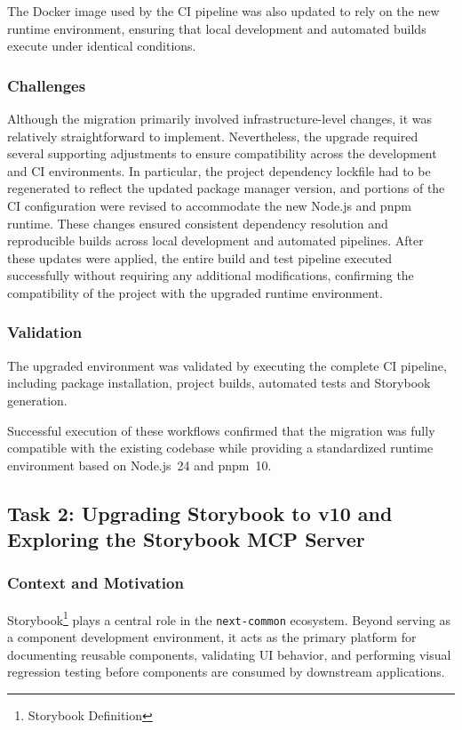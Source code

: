 The Docker image used by the CI pipeline was also updated to rely on the new runtime environment, ensuring that local development and automated builds execute under identical conditions.

\subsubsection{Challenges}

Although the migration primarily involved infrastructure-level changes, it was relatively straightforward to implement. Nevertheless, the upgrade required several supporting adjustments to ensure compatibility across the development and CI environments. In particular, the project dependency lockfile had to be regenerated to reflect the updated package manager version, and portions of the CI configuration were revised to accommodate the new Node.js and pnpm runtime. These changes ensured consistent dependency resolution and reproducible builds across local development and automated pipelines. After these updates were applied, the entire build and test pipeline executed successfully without requiring any additional modifications, confirming the compatibility of the project with the upgraded runtime environment.

\subsubsection{Validation}

The upgraded environment was validated by executing the complete \ac{CI} pipeline, including package installation, project builds, automated tests and Storybook generation.

Successful execution of these workflows confirmed that the migration was fully compatible with the existing codebase while providing a standardized runtime environment based on Node.js~24 and pnpm~10.

\subsection{Task 2: Upgrading Storybook to v10 and Exploring the Storybook MCP Server}
\label{sec:storybook-upgrade}

\subsubsection{Context and Motivation}

Storybook\footnote{Storybook Definition} plays a central role in the \texttt{next-common} ecosystem. Beyond serving as a component development environment, it acts as the primary platform for documenting reusable components, validating UI behavior, and performing visual regression testing before components are consumed by downstream applications.

